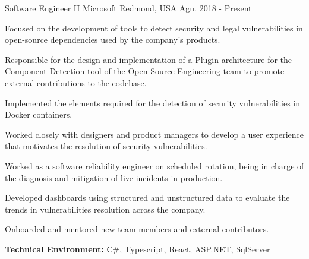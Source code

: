 
\begin{cventries}

\workexperienceentry
{Software Engineer II} %
{Microsoft} %
{Redmond, USA} %
{Agu. 2018 - Present} %
{ %
\begin{cvitems}
    \item {Focused on the development of tools to detect security and legal vulnerabilities in open-source dependencies used by the company's products. }
    \item {Responsible for the design and implementation of a Plugin architecture for the Component Detection tool of the Open Source Engineering team to promote external contributions to the codebase.}
    \item {Implemented the elements required for the detection of security vulnerabilities in Docker containers.}
    \item {Worked closely with designers and product managers to develop a user experience that motivates the resolution of security vulnerabilities. }
    \item {Worked as a software reliability engineer on scheduled rotation, being in charge of the diagnosis and mitigation of live incidents in production.}
    \item {Developed dashboards using structured and unstructured data to evaluate the trends in vulnerabilities resolution across the company. } 
    \item {Onboarded and mentored new team members and external contributors.} 
\end{cvitems}
}
{\textbf{Technical Environment:} C\#, Typescript, React, ASP.NET, SqlServer}



\end{cventries}
